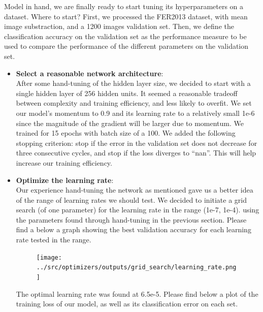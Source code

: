 Model in hand, we are finally ready to start tuning its hyperparameters on a dataset.
Where to start?
First, we processed the FER2013 dataset, with mean image substraction, and a 1200 images validation set.
Then, we define the classification accuracy on the validation set as
the performance measure to be used to compare the performance of the different parameters on the validation set.

\begin{itemize}[topsep=-10pt]
\item \textbf{Select a reasonable network architecture}:\\
  After some hand-tuning of the hidden layer size, we decided to start with a single hidden layer of 256 hidden units.
  It seemed a reasonable tradeoff between complexity and training efficiency, and less likely to overfit.
  We set our model's momentum to 0.9 and its learning rate to a relatively small 1e-6
  since the magnitude of the gradient will be larger due to momentum.
  We trained for 15 epochs with batch size of a 100.
  We added the following stopping criterion: stop if the error in the validation set does not decrease for three consecutive cycles,
  and stop if the loss diverges to ``nan''.
  This will help increase our training efficiency.

\item \textbf{Optimize the learning rate}:\\
  Our experience hand-tuning the network as mentioned gave us a better idea of the range of learning rates we should test.
  We decided to initiate a grid search (of one parameter) for the learning rate in the range (1e-7, 1e-4).
  using the parameters found through hand-tuning in the previous section.
  Please find a below a graph showing the best validation accuracy for each learning rate tested in the range.
  \begin{figure}[!ht]
      \centering
      {{\texttt{[image: ../src/optimizers/outputs/grid\_search/learning\_rate.png]}}}
  \end{figure}

  The optimal learning rate was found at 6.5e-5.
  Please find below a plot of the training loss of our model, as well as its classification error on each set.
  


\end{itemize}
